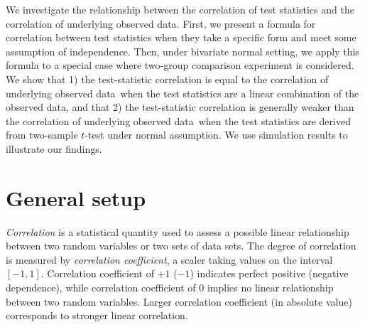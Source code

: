 \documentclass[review]{elsarticle}
\newcommand{\popucor}{the correlation of underlying observed data}
\begin{document}
	
	
	We investigate the relationship between the correlation of test
	statistics and \popucor.  First, we present a formula for correlation between
	test statistics when they take a specific form and meet some assumption of
	independence. Then, under bivariate normal setting, we apply this formula to a
	special case where two-group comparison experiment is considered. We show that
	1) the test-statistic correlation is equal to \popucor~when the test
	statistics are a linear combination of the observed data, and that 2) the test-statistic 
	correlation is generally weaker  
	than \popucor~when the test statistics are derived from two-sample $t$-test under normal
	assumption. We use simulation results to illustrate our findings.
	
	
	
	
	\section{General setup}\label{subsec:generalsetup}
	\textit{Correlation} is a statistical quantity used to assess a possible linear relationship 
	between two random variables or two sets of data sets. The degree of correlation is measured by 
	\textit{correlation coefficient}, a scaler taking values on the interval $[-1, 1]$. Correlation 
	coefficient of $+1$ ($-1$) indicates perfect positive (negative dependence), while correlation 
	coefficient of 0 implies no linear relationship between two random variables. Larger 
	correlation coefficient (in absolute value) corresponds to stronger linear correlation. 
	
\end{document}
